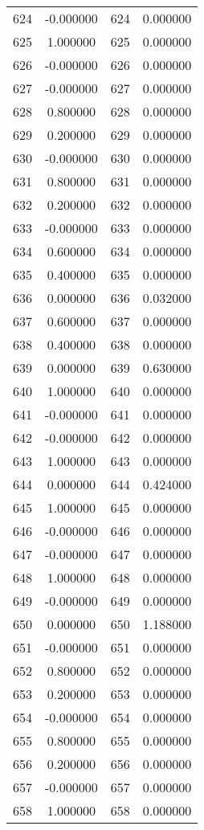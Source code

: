 \documentclass[12pt]{article}
\begin{document}
\begin{longtable}{@{}cccc@{}}
624 & -0.000000 & 624 & 0.000000 \\
625 & 1.000000 & 625 & 0.000000 \\
626 & -0.000000 & 626 & 0.000000 \\
627 & -0.000000 & 627 & 0.000000 \\
628 & 0.800000 & 628 & 0.000000 \\
629 & 0.200000 & 629 & 0.000000 \\
630 & -0.000000 & 630 & 0.000000 \\
631 & 0.800000 & 631 & 0.000000 \\
632 & 0.200000 & 632 & 0.000000 \\
633 & -0.000000 & 633 & 0.000000 \\
634 & 0.600000 & 634 & 0.000000 \\
635 & 0.400000 & 635 & 0.000000 \\
636 & 0.000000 & 636 & 0.032000 \\
637 & 0.600000 & 637 & 0.000000 \\
638 & 0.400000 & 638 & 0.000000 \\
639 & 0.000000 & 639 & 0.630000 \\
640 & 1.000000 & 640 & 0.000000 \\
641 & -0.000000 & 641 & 0.000000 \\
642 & -0.000000 & 642 & 0.000000 \\
643 & 1.000000 & 643 & 0.000000 \\
644 & 0.000000 & 644 & 0.424000 \\
645 & 1.000000 & 645 & 0.000000 \\
646 & -0.000000 & 646 & 0.000000 \\
647 & -0.000000 & 647 & 0.000000 \\
648 & 1.000000 & 648 & 0.000000 \\
649 & -0.000000 & 649 & 0.000000 \\
650 & 0.000000 & 650 & 1.188000 \\
651 & -0.000000 & 651 & 0.000000 \\
652 & 0.800000 & 652 & 0.000000 \\
653 & 0.200000 & 653 & 0.000000 \\
654 & -0.000000 & 654 & 0.000000 \\
655 & 0.800000 & 655 & 0.000000 \\
656 & 0.200000 & 656 & 0.000000 \\
657 & -0.000000 & 657 & 0.000000 \\
658 & 1.000000 & 658 & 0.000000 \\

\end{longtable}
\end{document}
